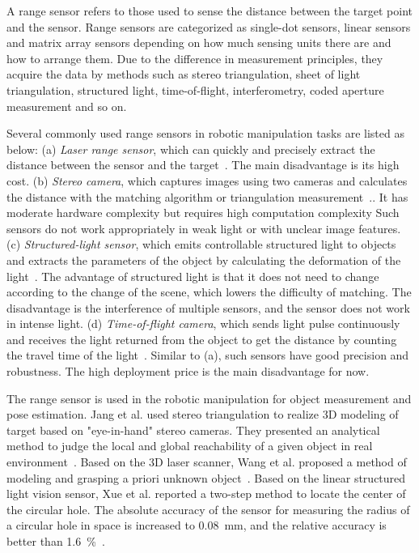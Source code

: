\documentclass[journal,twoside,web]{ieeecolor}
\begin{document}
A range sensor refers to those used to sense the distance between the target point and the sensor. 
Range sensors are categorized as single-dot sensors, linear sensors and matrix array sensors depending on how much sensing units there are and how to arrange them.
Due to the difference in measurement principles, they acquire the data by methods such as stereo triangulation, sheet of light triangulation, structured light, time-of-flight, interferometry, coded aperture measurement and so on.

Several commonly used range sensors in robotic manipulation tasks are listed as below: 
(a) \textit{Laser range sensor}, which can quickly and precisely extract the distance between the sensor and the target~\cite{Aleotti2014,Fur2018}. The main disadvantage is its high cost. 
(b) \textit{Stereo camera}, which captures images using two cameras and calculates the distance with the matching algorithm or triangulation measurement~\cite{Hu2016,Zhang2017,Pachtrachai2018,Deniz2018}.. It has moderate hardware complexity but requires high computation complexity Such sensors do not work appropriately in weak light or with unclear image features. 
(c) \textit{Structured-light sensor}, which emits controllable structured light to objects and extracts the parameters of the object by calculating the deformation of the light~\cite{Yang2017,Tran2017,Wieghardt2017,Anwar2017,Yu2018}. The advantage of structured light is that it does not need to change according to the change of the scene, which lowers the difficulty of matching. The disadvantage is the interference of multiple sensors, and the sensor does not work in intense light. 
(d) \textit{Time-of-flight camera}, which sends light pulse continuously and receives the light returned from the object to get the distance by counting the travel time of the light~\cite{Pan2016,Santos2018,Du2018,Lin2018,Han2018}. Similar to (a), such sensors have good precision and robustness. The high deployment price is the main disadvantage for now.
 
The range sensor is used in the robotic manipulation for object measurement and pose estimation. 
Jang et al. used stereo triangulation to realize 3D modeling of target based on "eye-in-hand" stereo cameras. They presented an analytical method to judge the local and global reachability of a given object in real environment~\cite{Jang05}. 
Based on the 3D laser scanner, Wang et al. proposed a method of modeling and grasping a priori unknown object~\cite{Wang05}. 
Based on the linear structured light vision sensor, Xue et al. reported a two-step method to locate the center of the circular hole. 
The absolute accuracy of the sensor for measuring the radius of a circular hole in space is increased to \SI{0.08}{\milli\meter}, and the relative accuracy is better than \SI{1.6}{\percent}~\cite{Xue2008}.
\end{document}
